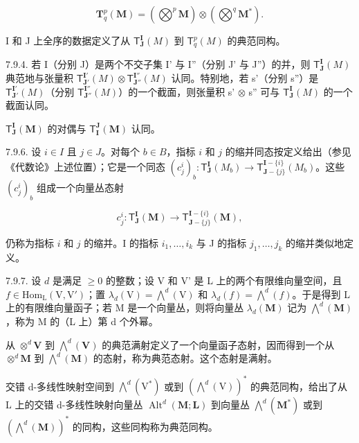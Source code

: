 \[
\mathbf {T} _ {q} ^ {p} (\mathbf {M}) = (\bigotimes^ {p} \mathbf {M}) \otimes (\bigotimes^ {q} \mathbf {M} ^ {*}).
\]

I 和 J 上全序的数据定义了从 \(\mathsf{T}_{\mathbf{J}}^{\mathbf{I}}(M)\) 到 \(\mathsf{T}_{q}^{p}(M)\) 的典范同构。

7.9.4. 若 I（分别 J）是两个不交子集 I' 与 I''（分别 J' 与 J''）的并，则 \(\mathsf{T}_{\mathbf{J}}^{\mathbf{I}}(M)\) 典范地与张量积 \(\mathsf{T}_{\mathbf{J}'}^{\mathbf{I}'}(M) \otimes \mathsf{T}_{\mathbf{J}''}^{\mathbf{I}''}(M)\) 认同。特别地，若 s'（分别 s''）是 \(\mathsf{T}_{\mathbf{J}'}^{\mathbf{I}'}(M)\)（分别 \(\mathsf{T}_{\mathbf{J}''}^{\mathbf{I}''}(M)\)）的一个截面，则张量积 s' \(\otimes\) s'' 可与 \(\mathsf{T}_{\mathbf{J}}^{\mathbf{I}}(M)\) 的一个截面认同。

\(\mathsf{T}_{\mathbf{J}}^{\mathbf{I}}(\mathbf{M})\) 的对偶与 \(\mathsf{T}_{\mathbf{I}}^{\mathbf{J}}(\mathbf{M})\) 认同。

7.9.6. 设 \(i \in I\) 且 \(j \in J\)。对每个 \(b \in B\)，指标 \(i\) 和 \(j\) 的缩并同态按定义给出（参见《代数论》上述位置）；它是一个同态 \((c_j^i)_b: \mathsf{T}_{\mathbf{J}}^{\mathbf{I}}(M_b) \to \mathsf{T}_{\mathbf{J}-\{j\}}^{\mathbf{I}-\{i\}}(M_b)\)。这些 \((c_j^i)_b\) 组成一个向量丛态射

\[
c _ {j} ^ {i}: \mathsf {T} _ {\mathbf {J}} ^ {\mathbf {I}} (\mathbf {M}) \to \mathsf {T} _ {\mathbf {J} - \{j \}} ^ {\mathbf {I} - \{i \}} (\mathbf {M}),
\]

仍称为指标 \(i\) 和 \(j\) 的缩并。I 的指标 \(i_{1},\ldots,i_{k}\) 与 J 的指标 \(j_{1},\ldots,j_{k}\) 的缩并类似地定义。

7.9.7. 设 \(d\) 是满足 \(\geqslant 0\) 的整数；设 V 和 V' 是 L 上的两个有限维向量空间，且 \(f \in \mathrm{Hom}_{\mathrm{L}}(\mathrm{V}, \mathrm{V}')\)；置 \(\lambda_{d}(\mathrm{V}) = \bigwedge^{d}(\mathrm{V})\) 和 \(\lambda_{d}(f) = \bigwedge^{d}(f)\)。于是得到 L 上的有限维向量函子；若 M 是一个向量丛，则将向量丛 \(\lambda_{d}(\mathbf{M})\) 记为 \(\bigwedge^{d}(\mathbf{M})\)，称为 M 的（L 上）第 d 个外幂。

从 \(\otimes^{d}\mathbf{V}\) 到 \(\bigwedge^{d}(\mathbf{V})\) 的典范满射定义了一个向量函子态射，因而得到一个从 \(\otimes^{d}\mathbf{M}\) 到 \(\bigwedge^{d}(\mathbf{M})\) 的态射，称为典范态射。这个态射是满射。

交错 d-多线性映射空间到 \(\bigwedge^{d}(\mathrm{V}^{*})\) 或到 \((\bigwedge^{d}(\mathrm{V}))^{*}\) 的典范同构，给出了从 L 上的交错 d-多线性映射向量丛 \(\operatorname{Alt}^{d}(\mathbf{M};\mathbf{L})\) 到向量丛 \(\bigwedge^{d}(\mathbf{M}^{*})\) 或到 \((\bigwedge^{d}(\mathbf{M}))^{*}\) 的同构，这些同构称为典范同构。

